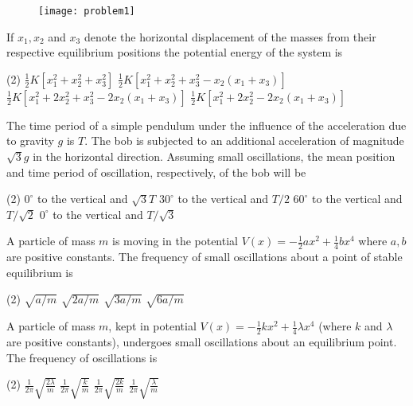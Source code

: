 \begin{enumerate}
\begin{minipage}{\textwidth}
\begin{figure}[H]
		\centering
		\texttt{[image: problem1]}
	\end{figure}
	If $x_{1}, x_{2}$ and $x_{3}$ denote the horizontal displacement of the masses from their respective equilibrium positions the potential energy of the system is
\end{minipage}
\begin{tasks}(2)
	\task[\textbf{A.}] $\frac{1}{2} K\left[x_{1}^{2}+x_{2}^{2}+x_{3}^{2}\right]$
	\task[\textbf{B.}]$\frac{1}{2} K\left[x_{1}^{2}+x_{2}^{2}+x_{3}^{2}-x_{2}\left(x_{1}+x_{3}\right)\right]$
	\task[\textbf{C.}]$\frac{1}{2} K\left[x_{1}^{2}+2 x_{2}^{2}+x_{3}^{2}-2 x_{2}\left(x_{1}+x_{3}\right)\right]$
	\task[\textbf{D.}]$\frac{1}{2} K\left[x_{1}^{2}+2 x_{2}^{2}-2 x_{2}\left(x_{1}+x_{3}\right)\right]$
\end{tasks}
\begin{minipage}{\textwidth}
	\item The time period of a simple pendulum under the influence of the acceleration due to gravity $g$ is $T$. The bob is subjected to an additional acceleration of magnitude $\sqrt{3} g$ in the horizontal direction. Assuming small oscillations, the mean position and time period of oscillation, respectively, of the bob will be
\end{minipage}
\begin{tasks}(2)
	\task[\textbf{A.}] $0^{\circ}$ to the vertical and $\sqrt{3} T$
	\task[\textbf{B.}]$30^{\circ}$ to the vertical and $T / 2$
	\task[\textbf{C.}]$60^{\circ}$ to the vertical and $T / \sqrt{2}$
	\task[\textbf{D.}]$0^{\circ}$ to the vertical and $T / \sqrt{3}$
\end{tasks}
\begin{minipage}{\textwidth}
	\item A particle of mass $m$ is moving in the potential $V(x)=-\frac{1}{2} a x^{2}+\frac{1}{4} b x^{4}$ where $a, b$ are positive constants. The frequency of small oscillations about a point of stable equilibrium is
\end{minipage}
\begin{tasks}(2)
	\task[\textbf{A.}] $\sqrt{a / m}$
	\task[\textbf{B.}]$\sqrt{2 a / m}$
	\task[\textbf{C.}]$\sqrt{3 a / m}$
	\task[\textbf{D.}]$\sqrt{6 a / m}$
\end{tasks}
\begin{minipage}{\textwidth}
	\item A particle of mass $m$, kept in potential $V(x)=-\frac{1}{2} k x^{2}+\frac{1}{4} \lambda x^{4}$ (where $k$ and $\lambda$ are positive constants), undergoes small oscillations about an equilibrium point. The frequency of oscillations is
\end{minipage}
\begin{tasks}(2)
	\task[\textbf{A.}] $\frac{1}{2 \pi} \sqrt{\frac{2 \lambda}{m}}$
	\task[\textbf{B.}]$\frac{1}{2 \pi} \sqrt{\frac{k}{m}}$
	\task[\textbf{C.}]$\frac{1}{2 \pi} \sqrt{\frac{2 k}{m}}$
	\task[\textbf{D.}]$\frac{1}{2 \pi} \sqrt{\frac{\lambda}{m}}$
\end{tasks}
 \end{enumerate}

